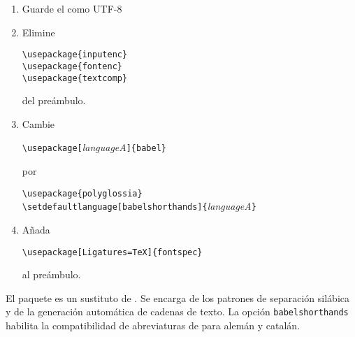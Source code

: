 \begin{enumerate}
\item Guarde el \filenomo como UTF-8
\item Elimine
\begin{lscommand}
\verb|\usepackage{inputenc}|\\
\verb|\usepackage{fontenc}|\\
\verb|\usepackage{textcomp}|
\end{lscommand}
del preámbulo.
\item Cambie
\begin{lscommand}
\verb|\usepackage[|\emph{languageA}\verb|]{babel}|
\end{lscommand}
por
\begin{lscommand}
\verb|\usepackage{polyglossia}|\\
\verb|\setdefaultlanguage[babelshorthands]{|\emph{languageA}\verb|}|
\end{lscommand}
\item Añada
\begin{lscommand}
\verb|\usepackage[Ligatures=TeX]{fontspec}|
\end{lscommand}
al preámbulo.
\end{enumerate}

El paquete \cite{polyglossia} es un sustituto de . 
Se encarga de los patrones de separación silábica y de la generación automática 
de cadenas de texto. La opción \verb|babelshorthands| habilita la 
compatibilidad de abreviaturas de  para alemán y catalán.

